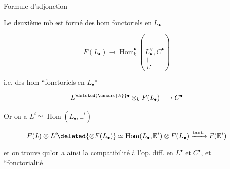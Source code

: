 
Formule d'adjonction


Le deuxième mb est formé des hom fonctoriels en $L_{\bullet}$

\[
 F(L_{\bullet})\longrightarrow\operatorname{Hom}^{\bullet}_{k}(\underset{\substack{\Vert\\L^{\bullet}}}{L_{\bullet}^{\vee}},C^{\bullet})
\]

i.e. des hom ``fonctoriels en $L_{\bullet}$''

\[
 L^{\deleted{\unsure{k}}\bullet}\otimes_k F(L_{\bullet})\longrightarrow C^{\bullet}
\]

Or on a $L^i\simeq\operatorname{Hom}(L_{\bullet},\mathbb E^i)$

\[
 F(L)\otimes L^i\deleted{\otimes F(L_{\bullet})}\simeq\operatorname{Hom}(L_{\bullet},\mathbb E^i)\otimes F(L_{\bullet})\xrightarrow{\mathrm{taut.}}F(\mathbb E^i)
\]

et on trouve qu'on a ainsi la  compatibilité à l'op. diff. en $L^{\bullet}$ et $C^{\bullet}$, et ``fonctorialité

